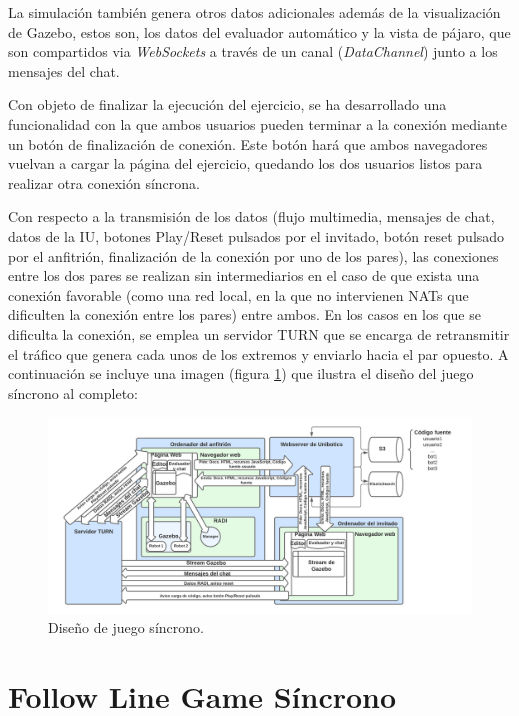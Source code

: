 \documentclass[a4paper, 12pt]{book}
\begin{document}
La simulación también genera otros datos adicionales además de la visualización de Gazebo, estos son, los datos del evaluador automático y la vista de pájaro, que son compartidos via \emph{WebSockets} a través de un canal (\emph{DataChannel}) junto a los mensajes del chat. 

Con objeto de finalizar la ejecución del ejercicio, se ha desarrollado una funcionalidad con la que ambos usuarios pueden terminar a la conexión mediante un botón de finalización de conexión. Este botón hará que ambos navegadores vuelvan a cargar la página del ejercicio, quedando los dos usuarios listos para realizar otra conexión síncrona.

Con respecto a la transmisión de los datos (flujo multimedia, mensajes de chat, datos de la IU, botones Play/Reset pulsados por el invitado, botón reset pulsado por el anfitrión, finalización de la conexión por uno de los pares), las conexiones entre los dos pares se realizan sin intermediarios en el caso de que exista una conexión favorable (como una red local, en la que no intervienen NATs que dificulten la conexión entre los pares) entre ambos. En los casos en los que se dificulta la conexión, se emplea un servidor TURN que se encarga de retransmitir el tráfico que genera cada unos de los extremos y enviarlo hacia el par opuesto. A continuación se incluye una imagen (figura \ref{figure:disenio_juego_sincrono}) que ilustra el diseño del juego síncrono al completo:

\begin{figure}[H]
	\centering
    \includegraphics[width=18.5cm]{img/diagrama_sincrono.png}
    \caption{Diseño de juego síncrono.}
    \label{figure:disenio_juego_sincrono}
\end{figure}

\section{Follow Line Game Síncrono} 
\label{sec:follow_line_game_sync}
\end{document}
